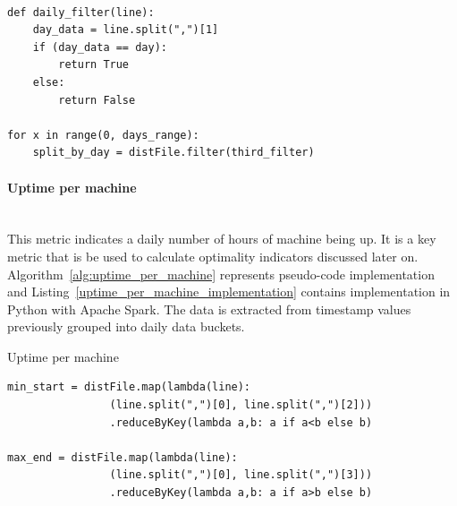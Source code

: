 \documentclass[]{final_report}
\newcommand{\myparagraph}[1]{\paragraph{#1}\mbox{}\\}
\begin{document}
\begin{lstlisting}[label={daily_usage},caption={Daily usage filter},frame=single]

def daily_filter(line):
    day_data = line.split(",")[1]
    if (day_data == day):
        return True
    else:
        return False

for x in range(0, days_range):
    split_by_day = distFile.filter(third_filter)

\end{lstlisting} 


\myparagraph{Uptime per machine}

This metric indicates a daily number of hours of machine being up. It is a key metric that is be used to calculate optimality indicators discussed later on. Algorithm~\ref{alg:uptime_per_machine} represents pseudo-code implementation and Listing~\ref{uptime_per_machine_implementation} contains implementation in Python with Apache Spark. The data is extracted from timestamp values previously grouped into daily data buckets.

\begin{algorithm}[h]
\caption{Uptime per machine}
\label{alg:uptime_per_machine}
 \algrenewcommand{}
 \algrenewcommand{}
\end{algorithm}

\begin{minipage}{\linewidth}
\begin{lstlisting}[label={uptime_per_machine_implementation},caption={Uptime per machine implementation in Apache Spark},frame=single] 
min_start = distFile.map(lambda(line): 
                (line.split(",")[0], line.split(",")[2]))
                .reduceByKey(lambda a,b: a if a<b else b)

max_end = distFile.map(lambda(line): 
                (line.split(",")[0], line.split(",")[3]))
                .reduceByKey(lambda a,b: a if a>b else b)
\end{lstlisting}
\end{minipage}
\end{document}
